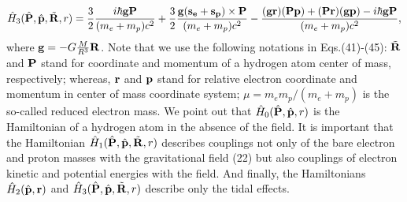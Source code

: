 \documentclass{ws-ijmpd}
\begin{document}
\begin{equation}
\hat H_3 (\hat {\bf P}, \hat {\bf p}, \tilde {\bf R}, r) =
\frac{3}{2}\frac{i \hbar {\bf g}{\bf P}}{(m_e+m_p)c^2}
+\frac{3}{2} \frac{{\bf g}{\bf(s_e+s_p)}\times {\bf
P}}{(m_e+m_p)c^2} - \frac{({\bf g}{\bf r})({\bf P}{\bf p})+({\bf
P}{\bf r})({\bf g}{\bf p})-i\hbar {\bf g}{\bf P}}{(m_e+m_p)c^2},
\end{equation}
where ${\bf g}=-G \frac{M}{R^3} {\bf R}$. Note that we use the
following notations in Eqs.(41)-(45): $\tilde {\bf R}$ and ${\bf
P}$ stand for coordinate and momentum of a hydrogen atom center of
mass, respectively; whereas, ${\bf r}$ and ${\bf p}$ stand for
relative electron coordinate and momentum in center of mass
coordinate system; $\mu = m_e m_p /(m_e + m_p)$ is the so-called
reduced electron mass. We point out that $\hat H_0 (\hat {\bf P},
\hat {\bf p}, r)$ is the Hamiltonian of a hydrogen atom in the
absence of the field. It is important that the Hamiltonian $\hat
H_1 (\hat {\bf P}, \hat {\bf p}, \tilde {\bf R}, r)$ describes
couplings not only of the bare electron and proton masses with the
gravitational field (22) but also couplings of electron kinetic
and potential energies with the field. And finally, the
Hamiltonians $\hat H_2 (\hat {\bf p}, {\bf r})$ and $\hat H_3
(\hat {\bf P}, \hat {\bf p}, \tilde {\bf R}, r)$ describe only the
tidal effects.
\end{document}
